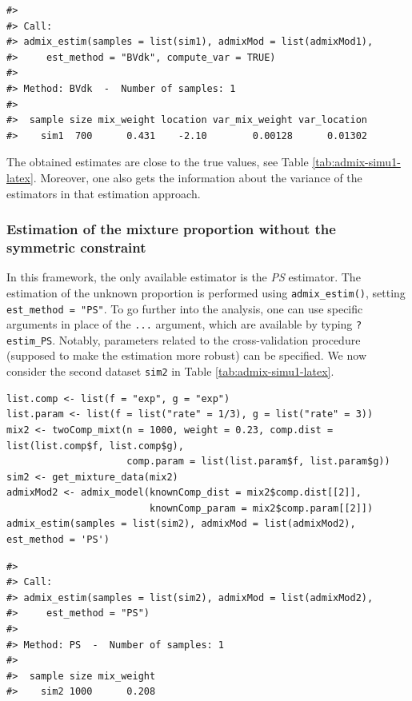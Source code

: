 \begin{verbatim}
#> 
#> Call:
#> admix_estim(samples = list(sim1), admixMod = list(admixMod1), 
#>     est_method = "BVdk", compute_var = TRUE)
#> 
#> Method: BVdk  -  Number of samples: 1 
#> 
#>  sample size mix_weight location var_mix_weight var_location
#>    sim1  700      0.431    -2.10        0.00128      0.01302
\end{verbatim}

The obtained estimates are close to the true values, see Table \ref{tab:admix-simu1-latex}. Moreover, one also gets the information about the variance of the estimators in that estimation approach.

\subsubsection{Estimation of the mixture proportion without the symmetric constraint}\label{estimation-of-the-mixture-proportion-without-the-symmetric-constraint}

In this framework, the only available estimator is the \emph{PS} estimator. The estimation of the unknown proportion is performed using \texttt{admix\_estim()}, setting \texttt{est\_method\ =\ "PS"}. To go further into the analysis, one can use specific arguments in place of the \texttt{...} argument, which are available by typing \texttt{?estim\_PS}. Notably, parameters related to the cross-validation procedure (supposed to make the estimation more robust) can be specified. We now consider the second dataset \texttt{sim2} in Table \ref{tab:admix-simu1-latex}.

\begin{verbatim}
list.comp <- list(f = "exp", g = "exp")
list.param <- list(f = list("rate" = 1/3), g = list("rate" = 3))
mix2 <- twoComp_mixt(n = 1000, weight = 0.23, comp.dist = list(list.comp$f, list.comp$g),
                     comp.param = list(list.param$f, list.param$g))
sim2 <- get_mixture_data(mix2)
admixMod2 <- admix_model(knownComp_dist = mix2$comp.dist[[2]],
                         knownComp_param = mix2$comp.param[[2]])
admix_estim(samples = list(sim2), admixMod = list(admixMod2), est_method = 'PS')
\end{verbatim}

\begin{verbatim}
#> 
#> Call:
#> admix_estim(samples = list(sim2), admixMod = list(admixMod2), 
#>     est_method = "PS")
#> 
#> Method: PS  -  Number of samples: 1 
#> 
#>  sample size mix_weight
#>    sim2 1000      0.208
\end{verbatim}

